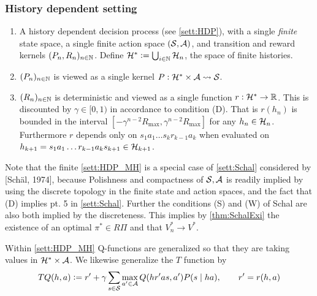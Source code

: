 \subsubsection{History dependent setting}

\begin{sett}
  \leavevmode
  \begin{enumerate}
    \item A history dependent decision process (see \cref{sett:HDP}),
      with a single \emph{finite} state space,
      a single finite action space $(\mathcal{S}, \mathcal{A})$,
      and transition and reward kernels $(P_n, R_n)_{n \in \mathbb{N}}$.
      Define $\mathcal{H}^* \vcentcolon= \bigcup_{i \in \mathbb{N}} \mathcal{H}_n$,
      the space of finite histories.
    \item $(P_n)_{n \in \mathbb{N}}$ is viewed as a single kernel
      $P : \mathcal{H}^* \times \mathcal{A} \leadsto \mathcal{S}$.
    \item $(R_n)_{n \in \mathbb{N}}$ is deterministic and viewed as a single function
      $r : \mathcal{H}^* \to \mathbb{R}$.
      This is discounted by $\gamma \in [0,1)$ in accordance to
      condition (D). That is
      $r(h_n)$ is bounded in the interval
      $[-\gamma^{n-2}R_{\max}, \gamma^{n-2} R_{\max}]$ for any
      $h_n \in \mathcal{H}_n$.
      Furthermore $r$ depends only on $s_1 a_1 \dots s_k r_{k-1} a_k$
      when evaluated on
      $h_{k+1} = s_1 a_1 \dots r_{k-1} a_k s_{k+1} \in \mathcal{H}_{k+1}$.
  \end{enumerate}
  \label{sett:HDP_MH}
\end{sett}

\begin{rem}
  Note that the finite \cref{sett:HDP_MH} is a special case of
  \cref{sett:Schal} considered by [Schäl, 1974],
  because Polishness and compactness of $\mathcal{S}, \mathcal{A}$ is readily
  implied by using the discrete topology in the finite state and action
  spaces, and the fact that (D) implies pt. 5 in \cref{sett:Schal}.
  Further the conditions (S) and (W) of Schal are also both implied by
  the discreteness.
  This implies by \cref{thm:SchalExi} the existence of an optimal
  $\pi^* \in R\Pi$ and that $V^*_n \to V^*$.
\end{rem}

Within \cref{sett:HDP_MH} Q-functions are generalized so that
they are taking values in $\mathcal{H}^* \times \mathcal{A}$.
We likewise generalize the $T$ function by
\[ TQ(h, a) \vcentcolon= r' +
  \gamma \sum_{s\in\mathcal{S}} \max_{a' \in \mathcal{A}} Q(hr'as, a') P(s \mid ha),
\qquad r' = r(h, a)\]

